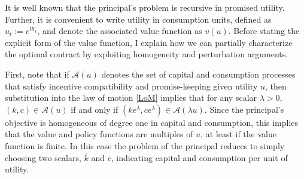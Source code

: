 \documentclass[11pt]{article}
\theoremstyle{plain}
\theoremstyle{definition} %
\begin{document}
It is well known that the principal's problem is recursive in promised utility. Further, it is convenient to write utility in consumption units, defined as $u_t := e^{W_t}$, and denote the associated value function as $v(u)$. Before stating the explicit form of the value function, I explain how we can partially characterize the optimal contract by exploiting homogeneity and perturbation arguments.

First, note that if $\mathcal{A}(u)$ denotes the set of capital and consumption processes that satisfy incentive compatibility and promise-keeping given utility $u$, then substitution into the law of motion \eqref{LoM} implies that for any scalar $\lambda > 0$, $(k,c) \in \mathcal{A}(u)$ if and only if $(ke^{\lambda},ce^{\lambda}) \in \mathcal{A}(\lambda u)$. Since the principal's objective is homogeneous of degree one in capital and consumption, this implies that the value and policy functions are multiples of $u$, at least if the value function is finite. In this case the problem of the principal reduces to simply choosing two scalars, $\overline{k}$ and $\overline{c}$, indicating capital and consumption per unit of utility. 
\end{document}
